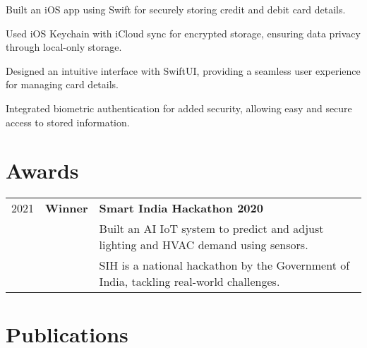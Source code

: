 \documentclass{fonts}
\begin{document}
\textbf{\href{https://github.com/swiftlysingh/Holder}{}} 
\begin{tightemize}
    \item Built an iOS app using Swift for securely storing credit and debit card details.
    \item Used iOS Keychain with iCloud sync for encrypted storage, ensuring data privacy through local-only storage.
    \item Designed an intuitive interface with SwiftUI, providing a seamless user experience for managing card details.
    \item Integrated biometric authentication for added security, allowing easy and secure access to stored information.
\end{tightemize}


\section{Awards} 
\begin{tabular}{rll}
2021 & \textbf{Winner} & \textbf{Smart India Hackathon 2020} \\
     & & Built an AI IoT system to predict and adjust lighting and HVAC demand using sensors. \\
     & & SIH is a national hackathon by the Government of India, tackling real-world challenges.
\end{tabular}
\sectionsep


\section{Publications} 
\renewcommand\refname{\vskip -1.5em} %


\nocite{*}
\end{document}
